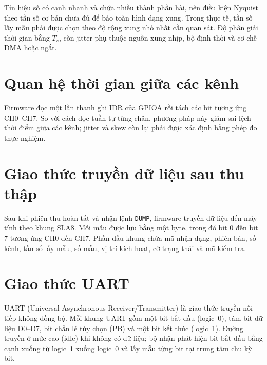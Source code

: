 Tín hiệu số có cạnh nhanh và chứa nhiều thành phần hài, nên điều kiện Nyquist theo tần số cơ bản chưa đủ để bảo toàn hình dạng xung. Trong thực tế, tần số lấy mẫu phải được chọn theo độ rộng xung nhỏ nhất cần quan sát. Độ phân giải thời gian bằng \(T_s\), còn jitter phụ thuộc nguồn xung nhịp, bộ định thời và cơ chế DMA hoặc ngắt.

\section{Quan hệ thời gian giữa các kênh}\label{sec:timing}

Firmware đọc một lần thanh ghi IDR của GPIOA rồi tách các bit tương ứng CH0--CH7. So với cách đọc tuần tự từng chân, phương pháp này giảm sai lệch thời điểm giữa các kênh; jitter và skew còn lại phải được xác định bằng phép đo thực nghiệm.

\section{Giao thức truyền dữ liệu sau thu thập}\label{sec:protocol}

Sau khi phiên thu hoàn tất và nhận lệnh \texttt{DUMP}, firmware truyền dữ liệu đến máy tính theo khung SLA8. Mỗi mẫu được lưu bằng một byte, trong đó bit 0 đến bit 7 tương ứng CH0 đến CH7. Phần đầu khung chứa mã nhận dạng, phiên bản, số kênh, tần số lấy mẫu, số mẫu, vị trí kích hoạt, cờ trạng thái và mã kiểm tra.

\section{Giao thức UART}\label{sec:uart-theory}

UART (Universal Asynchronous Receiver/Transmitter) là giao thức truyền nối tiếp không đồng bộ. Mỗi khung UART gồm một bit bắt đầu (logic~0), tám bit dữ liệu D0--D7, bit chẵn lẻ tùy chọn (PB) và một bit kết thúc (logic~1). Đường truyền ở mức cao (idle) khi không có dữ liệu; bộ nhận phát hiện bit bắt đầu bằng cạnh xuống từ logic~1 xuống logic~0 và lấy mẫu từng bit tại trung tâm chu kỳ bit.

